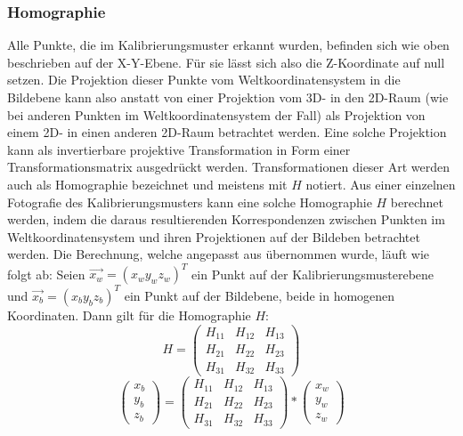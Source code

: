 \subsubsection{Homographie}
Alle Punkte, die im Kalibrierungsmuster erkannt wurden, befinden sich wie oben beschrieben auf der X-Y-Ebene. Für sie lässt sich also die Z-Koordinate auf null setzen. Die Projektion dieser Punkte vom Weltkoordinatensystem in die Bildebene kann also anstatt von einer Projektion vom 3D- in den 2D-Raum (wie bei anderen Punkten im Weltkoordinatensystem der Fall) als Projektion von einem 2D- in einen anderen 2D-Raum betrachtet werden. Eine solche Projektion kann als invertierbare projektive Transformation in Form einer Transformationsmatrix ausgedrückt werden. Transformationen dieser Art werden auch als Homographie bezeichnet und meistens mit \(H\) notiert. Aus einer einzelnen Fotografie des Kalibrierungsmusters kann eine solche Homographie \(H\) berechnet werden, indem die daraus resultierenden Korrespondenzen zwischen Punkten im Weltkoordinatensystem und ihren Projektionen auf der Bildeben betrachtet werden. Die Berechnung, welche angepasst aus \cite{Kriegman:07} übernommen wurde, läuft wie folgt ab:
\newline
Seien \(\vec{x_w} = \left(x_w y_w z_w\right)^{T}\) ein Punkt auf der Kalibrierungsmusterebene und \(\vec{x_b} = \left(x_b y_b z_b\right)^{T}\) ein Punkt auf der Bildebene, beide in homogenen Koordinaten. Dann gilt für die Homographie \(H\):
\begin{equation}
	H = \begin{pmatrix}
			H_{11} & H_{12} & H_{13} \\
			H_{21} & H_{22} & H_{23} \\
			H_{31} & H_{32} & H_{33}
		\end{pmatrix}
\end{equation}
\begin{equation}
	\left(\begin{array}{c}x_b\\y_b\\z_b\end{array}\right) =  \begin{pmatrix}
			H_{11} & H_{12} & H_{13} \\
			H_{21} & H_{22} & H_{23} \\
			H_{31} & H_{32} & H_{33}
		\end{pmatrix} * \left(\begin{array}{c}x_w\\y_w\\z_w\end{array}\right)
\end{equation}



